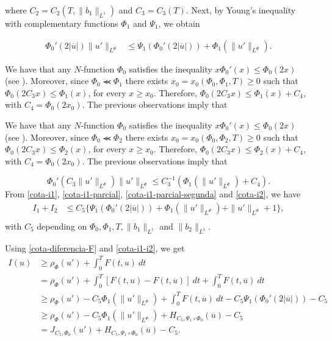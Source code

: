 \documentclass[twoside]{article}
\theoremstyle{remark}
\newcommand{\orlnor}{\|_{L^{\Phi}}}
\renewcommand{\leq}{\leqslant}
\renewcommand{\geq}{\geqslant}
\begin{document}
where $C_2=C_2(T, \|b_1\|_{L^1} )$ and $C_3=C_3(T)$. 
Next, by Young's inequality with complementary functions $\Phi_1$ and $\Psi_1$, we obtain


\begin{equation}\label{cota-i1-parcial}
 \begin{split}
\Phi_0'(2|\overline{u}|) \|u'\orlnor
&\leq 
\Psi_1(\Phi_0'(2|\overline{u}|))+
\Phi_1(\|u'\orlnor).
\end{split}
\end{equation}

We have that any $N$-function $\Phi_0$ satisfies the inequality $x\Phi_0'(x)\leq \Phi_0(2x)$ (see \cite[p. 17]{rao1991theory} ). Moreover, since $\Phi_0\llcurly\Phi_1$ there exists $x_0=x_0(\Phi_0,\Phi_1,T)\geq 0$ such that $\Phi_0(2C_3x)\leq \Phi_1(x)$, for every $x\geq x_0$. Therefore, $\Phi_0(2C_3x)\leq \Phi_1(x)+C_4$, with $C_4=\Phi_0(2x_0)$. The previous observations imply that

We have that any $N$-function $\Phi_0$ satisfies the inequality $x\Phi_0'(x)\leq \Phi_0(2x)$ (see \cite[p. 17]{rao1991theory} ). Moreover, since $\Phi_0\llcurly\Phi_2$ there exists $x_0=x_0(\Phi_0,\Phi_2,T)\geq 0$ such that $\Phi_0(2C_3x)\leq \Phi_2(x)$, for every $x\geq x_0$. Therefore, $\Phi_0(2C_3x)\leq \Phi_2(x)+C_4$, with $C_4=\Phi_0(2x_0)$. The previous observations imply that

\begin{equation}\label{cota-i1-parcial-segunda}
\Phi_0'(C_3\|u'\orlnor) \|u'\orlnor
\leq 
C_3^{-1}(\Phi_1(\|u'\orlnor)+C_4).
\end{equation}
From \eqref{cota-i1}, \eqref{cota-i1-parcial}, \eqref{cota-i1-parcial-segunda} and \eqref{cota-i2}, we have
\begin{equation}\label{cota-i1-i2}
\begin{split}
I_1+I_2
&
\leq C_5
\bigg\{ 
\Psi_1(\Phi_0'(2|\overline{u}|))
+\Phi_1(\|u'\orlnor)
+\|u'\orlnor +1
\bigg\},\\
\end{split}
\end{equation}
with $C_5$ depending on $\Phi_0, \Phi_1, T, \|b_1\|_{L^1}$ and $\|b_2\|_{L^1} $.

Using  \eqref{cota-diferencia-F} and
\eqref{cota-i1-i2}, we get
\begin{equation}\label{cota_inf_I}
\begin{split}
I(u)&
\geq\rho_{\Phi}(u')+\int_0^TF(t,u)\ dt
\\ 
&=\rho_{\Phi}( u')+ \int_0^T \left[F(t,u)-F(t,\overline{u})\right]\ dt
+  \int_0^TF(t,\overline{u})\ dt
\\
&\geq \rho_{\Phi}( u')
-C_5 \Phi_1(\|u'\orlnor)
+\int_0^TF(t,\overline{u})\ dt-
C_5 \Psi_1(\Phi_0'(2|\overline{u}|))-
C_5
\\
&\geq 
\rho_{\Phi}( u')
-C_5 \Phi_1(\|u'\orlnor)
+H_{C_5, \Psi_1\circ\Phi_0}(\overline{u})
-C_5
\\
&=
J_{C_5,\Phi_0}(u')
+H_{C_5, \Psi_1\circ\Phi_0}(\overline{u})
-C_5.
\end{split}
\end{equation}
\end{document}
